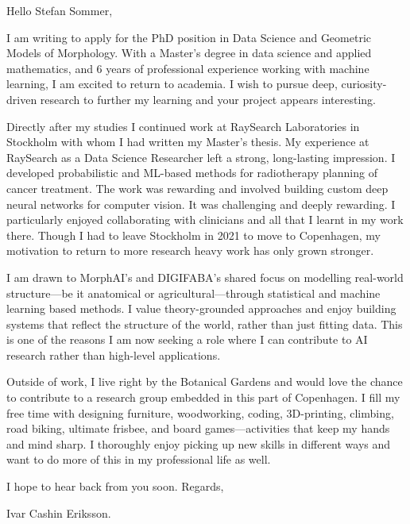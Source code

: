 \documentclass[11pt,a4paper]{moderncv}
\begin{document}
\makecvtitle
Hello Stefan Sommer,

\hspace*{2em}
I am writing to apply for the PhD position in Data Science and Geometric Models of Morphology. With a Master's degree in data science and applied mathematics, and 6 years of professional experience working with machine learning, I am excited to return to academia. I wish to pursue deep, curiosity-driven research to further my learning and your project appears interesting. 

\hspace*{2em}
Directly after my studies I continued work at RaySearch Laboratories in Stockholm with whom I had written my Master's thesis. My experience at RaySearch as a Data Science Researcher left a strong, long-lasting impression. I developed probabilistic and ML-based methods for radiotherapy planning of cancer treatment. The work was rewarding and involved building custom deep neural networks for computer vision. It was challenging and deeply rewarding. I particularly enjoyed collaborating with clinicians and all that I learnt in my work there. Though I had to leave Stockholm in 2021 to move to Copenhagen, my motivation to return to more research heavy work has only grown stronger. 

\hspace*{2em}
I am drawn to MorphAI's and DIGIFABA's shared focus on modelling real-world structure---be it anatomical or agricultural---through statistical and machine learning based methods. I value theory-grounded approaches and enjoy building systems that reflect the structure of the world, rather than just fitting data. This is one of the reasons I am now seeking a role where I can contribute to AI research rather than high-level applications.

\hspace*{2em}
Outside of work, I live right by the Botanical Gardens and would love the chance to contribute to a research group embedded in this part of Copenhagen. I fill my free time with designing furniture, woodworking,  coding, 3D-printing, climbing, road biking, ultimate frisbee, and board games---activities that keep my hands and mind sharp. I thoroughly enjoy picking up new skills in different ways and want to do more of this in my professional life as well.

\vspace{12 mm}
I hope to hear back from you soon. Regards, 

\vspace{3 mm} 
Ivar Cashin Eriksson.
\end{document}
